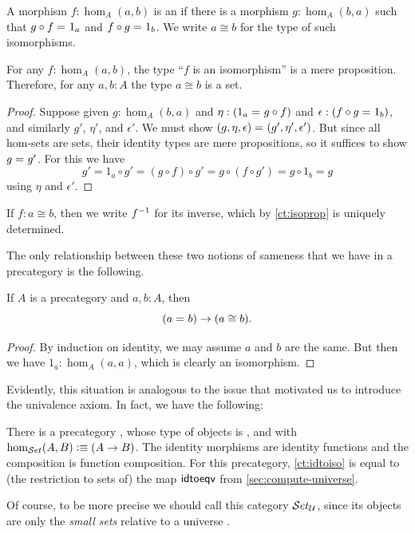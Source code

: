 \begin{defn}\label{ct:isomorphism}
  A morphism $f:\hom_A(a,b)$ is an 
  if there is a morphism $g:\hom_A(b,a)$ such that $g\circ f =_{} 1_a$ and $f\circ g =_{} 1_b$.
  We write $a\cong b$ for the type of such isomorphisms.
\end{defn}

\begin{lem}\label{ct:isoprop}
  For any $f:\hom_A(a,b)$, the type ``$f$ is an isomorphism'' is a mere proposition.
  Therefore, for any $a,b:A$ the type $a\cong b$ is a set.
\end{lem}
\begin{proof}
  Suppose given $g:\hom_A(b,a)$ and $\eta:(1_a =_{} g\circ f)$ and $\epsilon:(f\circ g =_{} 1_b)$, and similarly $g'$, $\eta'$, and $\epsilon'$.
We must show $(g,\eta,\epsilon) =_{} (g',\eta',\epsilon')$.
  But since all hom-sets are sets, their identity types are mere propositions, so it suffices to show $g =_{} g'$.
  For this we have
  \[g' = 1_a\circ g' = (g\circ f)\circ g' = g\circ (f\circ g') = g\circ 1_b = g\]
  using $\eta$ and $\epsilon'$.
\end{proof}

%
If $f:a\cong b$, then we write ${f}^{-1}$ for its inverse, which by \cref{ct:isoprop} is uniquely determined.

The only relationship between these two notions of sameness that we have in a precategory is the following.

\begin{lem}\label{ct:idtoiso}
  If $A$ is a precategory and $a,b:A$, then
  \[(a =_{} b)\to (a \cong b).\]
\end{lem}
\begin{proof}
  By induction on identity, we may assume $a$ and $b$ are the same.
  But then we have $1_a:\hom_A(a,a)$, which is clearly an isomorphism.
\end{proof}

Evidently, this situation is analogous to the issue that motivated us to introduce the univalence axiom.
In fact, we have the following:

\begin{eg}\label{ct:precatset}
  There is a precategory \uset, whose type of objects is \set, and with $\hom_{\mathcal{S}et}(A,B) \vcentcolon\equiv (A\to B)$.
  The identity morphisms are identity functions and the composition is function composition.
  For this precategory, \cref{ct:idtoiso} is equal to (the restriction to sets of) the map $\mathsf{idtoeqv}$ from \cref{sec:compute-universe}.

  Of course, to be more precise we should call this category $\mathcal{S}et_\mathcal{U}$, since its objects are only the \emph{small sets}
  relative to a universe \UU.
\end{eg}

